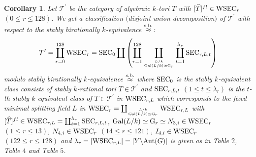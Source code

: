 \documentclass{amsart}
\theoremstyle{plain}
\newtheorem{corollary}[theorem]{Corollary}
\theoremstyle{definition}
\theoremstyle{remark}
\begin{document}
\begin{corollary}\label{cor1.41}
Let $\mathcal{T}^\prime$ be the category of algebraic $k$-tori $T$ 
with $[\widehat{T}]^{fl}\in {\rm WSEC}_r$ $(0\leq r\leq 128)$. 
We get a classification $($disjoint union decomposition$)$ 
of $\mathcal{T}^\prime$ with respect to 
the stably birationally $k$-equivalence $\stackrel{\rm s.b.}{\approx}$: 
\begin{align*}
\mathcal{T}^\prime=\coprod_{r=0}^{128} {\rm WSEC}_r
={\rm SEC}_0\coprod
\left(\coprod_{r=1}^{128} 
\coprod_{L/k\atop {\rm Gal}(L/k)\simeq {\rm G}_r}
\coprod_{t=1}^{\lambda_{r}} {\rm SEC}_{r,L,t}\right)
\end{align*}
modulo stably birationally $k$-equivalence $\stackrel{\rm s.b.}{\approx}$ 
where ${\rm SEC}_0$ is the stably $k$-equivalent class consists of 
stably $k$-rational tori $T\in \mathcal{T}^\prime$ 
and 
${\rm SEC}_{r,L,t}$ $(1\leq t\leq \lambda_{r})$ is the $t$-th 
stably $k$-equivalent class of $T\in \mathcal{T}^\prime$ in 
${\rm WSEC}_{r,L}$ which corresponds to the fixed minimal splitting field $L$ 
in 
${\rm WSEC}_r=\coprod_{L/k\atop {\rm Gal}(L/k)\simeq {\rm G}_r} {\rm WSEC}_{r,L}$ 
with 
$[\widehat{T}]^{fl}\in {\rm WSEC}_{r,L}
=\coprod_{t=1}^{\lambda_r} {\rm SEC}_{r,L,t}$, 
${\rm Gal}(L/k)\simeq {\rm G}_r\simeq N_{3,i}\in {\rm WSEC}_r$ $(1\leq r\leq 13)$, 
$N_{4,i}\in {\rm WSEC}_r$ $(14\leq r\leq 121)$, $I_{4,i}\in {\rm WSEC}_r$ $(122\leq r\leq 128)$ and 
$\lambda_r=|{\rm WSEC}_{r,L}|=|Y\backslash {\rm Aut}(G)|$ 
is given as in Table $2$, Table $4$ and Table $5$. 
\end{corollary}
%
\end{document}
